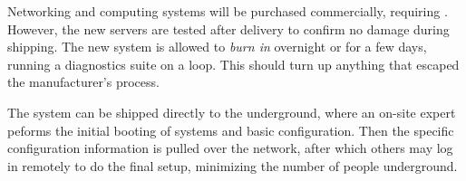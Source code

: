 Networking and computing systems will be purchased commercially, requiring . However, the new servers are tested after delivery to confirm no damage during shipping. The new system is allowed to \textit{burn in} overnight or for a few days, 
running a diagnostics suite on a loop. This should turn up anything that escaped the manufacturer's  process.

The system can be shipped directly to the underground, 
where an on-site
expert peforms the initial booting of systems and basic
configuration. Then the specific configuration information is pulled over
the network, after which others may log in remotely to do the final
setup, minimizing the number of people underground.

 

